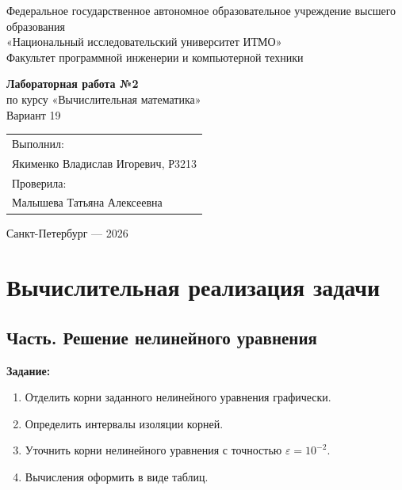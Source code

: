 \documentclass[12pt,a4paper]{article}
\begin{document}
\hypersetup{pageanchor=false}
\begin{titlepage}
  \thispagestyle{empty}
  \begin{center}
    {\small Федеральное государственное автономное образовательное учреждение высшего образования\\
    «Национальный исследовательский университет ИТМО»}\\[0.8em]
    {\small Факультет программной инженерии и компьютерной техники}

    \vfill

    {\Large\textbf{Лабораторная работа №2}}\\[0.6em]
    {\large по курсу «Вычислительная математика»}\\[0.6em]
    {\large Вариант 19}

    \vfill

    \begin{flushright}
      \begin{tabular}{l}
        Выполнил:\\
        Якименко Владислав Игоревич, Р3213\\[0.8em]
        Проверила:\\
        Малышева Татьяна Алексеевна
      \end{tabular}
    \end{flushright}

    \vfill

    Санкт-Петербург --- 2026
  \end{center}
\end{titlepage}
\clearpage
\hypersetup{pageanchor=true}

\tableofcontents
\thispagestyle{empty}
\clearpage
{}

\section{Вычислительная реализация задачи}

\subsection{Часть. Решение нелинейного уравнения}

\textbf{Задание:}
\begin{enumerate}[label=\arabic*., leftmargin=1.2cm]
  \item Отделить корни заданного нелинейного уравнения графически.
  \item Определить интервалы изоляции корней.
  \item Уточнить корни нелинейного уравнения с точностью $\varepsilon = 10^{-2}$.
  \item Вычисления оформить в виде таблиц.
\end{enumerate}
\end{document}
